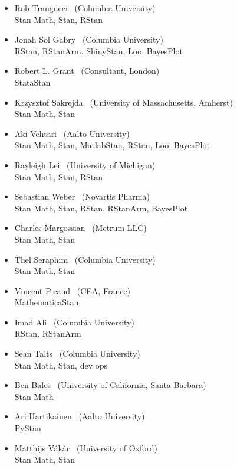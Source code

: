 \begin{itemize}
\\ {\footnotesize MatlabStan}
\item Rob Trangucci \   (Columbia University)
\\ {\footnotesize Stan Math, Stan, RStan}
\item Jonah Sol Gabry \ (Columbia University)
\\ {\footnotesize RStan, RStanArm, ShinyStan, Loo, BayesPlot}
\item Robert L. Grant \ (Consultant, London)
\\ {\footnotesize StataStan}
\item Krzysztof Sakrejda \ (University of Massachusetts, Amherst)
\\ {\footnotesize Stan Math, Stan}
\item Aki Vehtari \ (Aalto University) \\ {\footnotesize Stan Math,
    Stan, MatlabStan, RStan, Loo, BayesPlot}
\item Rayleigh Lei \ (University of Michigan)
\\ {\footnotesize Stan Math, Stan, RStan}
\item Sebastian Weber \ (Novartis Pharma)
\\ {\footnotesize Stan Math, Stan, RStan, RStanArm, BayesPlot}
\item Charles Margossian \ (Metrum LLC)
\\ {\footnotesize Stan Math, Stan}
\item Thel Seraphim \ (Columbia University)
\\ {\footnotesize Stan Math, Stan}
\item Vincent Picaud \ (CEA, France)
\\ {\footnotesize MathematicaStan}
\item Imad Ali \ (Columbia University)
\\ {\footnotesize RStan, RStanArm}
\item Sean Talts \ (Columbia University)
\\ {\footnotesize Stan Math, Stan, dev ops}
\item Ben Bales \ (University of California, Santa Barbara)
\\ {\footnotesize Stan Math}
\item Ari Hartikainen \ (Aalto University)
\\ {\footnotesize PyStan}
\item Matthijs V\'ak\'ar \ (University of Oxford)
\\ {\footnotesize Stan Math, Stan}

\end{itemize}

